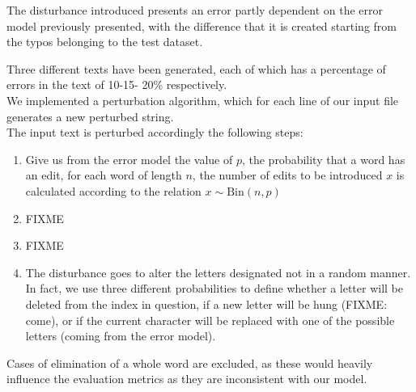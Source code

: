 The disturbance introduced presents an error partly dependent on the error model previously presented, with the 
difference that it is created starting from the typos belonging to the test dataset.

Three different texts have been generated, each of which has a percentage of errors in the text of \num{10}-\num{15}-
\num{20}\% respectively. \\

We implemented a perturbation algorithm, which for each line of our input file generates a new perturbed string.\\
The input text is perturbed accordingly the following steps:

\begin{enumerate}
	\item Give us from the error model the value of $p$, the probability that a word has an edit, for each word  of length 
	$n$, the number of edits to be introduced $x$ is calculated according to the relation $ x \sim \text{Bin}(n, 
	p)$
	\item FIXME %
	\item FIXME %
	\item The disturbance goes to alter the letters designated not in a random manner. 
	In fact, we use three different probabilities to define whether a letter will be deleted from the index in question, if a new 
	letter will be hung (FIXME: come), or if the current character will be replaced with one of the possible letters (coming 
	from the error model).
	
\end{enumerate}

Cases of elimination of a whole word are excluded, as these would heavily influence the evaluation metrics as they are 
inconsistent with our model.



